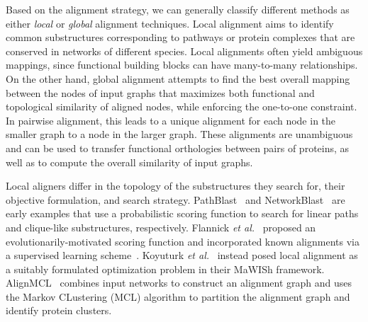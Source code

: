 \documentclass[10pt, journal, compsoc, final]{IEEEtran}
\begin{document}
Based on the alignment strategy, we can generally classify different methods as
either \textit{local} or \textit{global} alignment techniques. Local alignment aims
to identify common substructures corresponding to pathways or protein complexes
that are conserved in networks  of different species.
Local alignments often yield ambiguous
mappings, since functional building blocks can have many-to-many relationships. On
the other hand, global alignment attempts to find the best overall mapping between
the nodes of input graphs that maximizes both functional and topological similarity
of aligned nodes, while enforcing the one-to-one constraint. In pairwise alignment,
this leads to a unique alignment for each node in the smaller graph to a 
node in the larger graph. These alignments are unambiguous and can be used
to transfer functional orthologies between pairs of proteins, as well as to compute
the overall similarity of input graphs.

Local aligners differ in the topology of the substructures they search for, their objective formulation, and search strategy. PathBlast~\cite{PathBlast1, PathBlast2} and NetworkBlast~\cite{NetworkBlast, NetworkBlast-M} 
are early examples that use a probabilistic scoring function to search for linear paths and clique-like substructures, respectively. Flannick \textit{et al.}~\cite{Graemlin1} proposed an evolutionarily-motivated scoring function and incorporated known alignments via a supervised learning scheme~\cite{Graemlin2}.
Koyuturk \textit{et al.}~\cite{MaWish1, MaWish2} instead posed local alignment 
as a suitably formulated optimization problem in their MaWISh framework. AlignMCL~\cite{AlignMCL} combines input networks to construct an alignment graph and uses the Markov CLustering (MCL) algorithm to partition the alignment graph and identify protein clusters.
\end{document}
